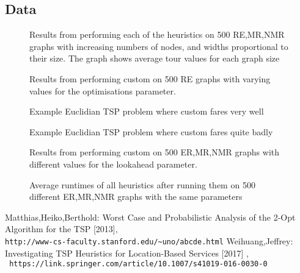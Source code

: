 \documentclass{report}
\begin{document}
\subsection{Data}
\begin{figure}[p]
    \caption{Results from performing each of the heuristics on 500 RE,MR,NMR graphs with increasing numbers of nodes, and widths proportional to their size. The graph shows average tour values for each graph size}
    \centering
    \scalebox{0.5}{}
\end{figure}
\begin{figure}[p]
    \caption{Results from performing custom on 500 RE graphs with varying values for the optimisations parameter.}
    \centering
    \scalebox{0.5}{}
\end{figure}
\begin{figure}[p]
    \caption{Example Euclidian TSP problem where custom fares very well}
    \centering
    \scalebox{0.5}{}
\end{figure}
\begin{figure}[p]
    \caption{Example Euclidian TSP problem where custom fares quite badly}
    \centering
    \scalebox{0.5}{}
\end{figure}

\begin{figure}[h]
    \caption{Results from performing custom on 500 ER,MR,NMR graphs with different values for the lookahead parameter.}
    \centering
    \scalebox{0.5}{}
\end{figure}

\begin{figure}[h]
    \caption{Average runtimes of all heuristics after running them on 500 different ER,MR,NMR graphs with the same parameters}
    \centering
    \scalebox{0.5}{}
\end{figure}

\begin{thebibliography}{}
Matthias,Heiko,Berthold: Worst Case and Probabilistic Analysis of the 2-Opt Algorithm for the TSP [2013],
\\\texttt{http://www-cs-faculty.stanford.edu/\~{}uno/abcde.html}
Weihuang,Jeffrey: Investigating TSP Heuristics for Location-Based Services [2017]
,
\\\texttt{
https://link.springer.com/article/10.1007/s41019-016-0030-0}
\end{thebibliography}
\end{document}
